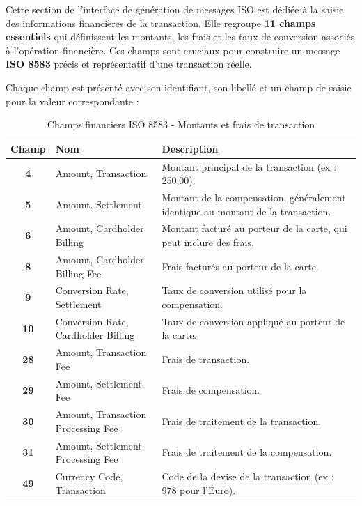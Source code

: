 \begin{enumerate}[label=\alph*)]
Cette section de l'interface de génération de messages ISO est dédiée à la saisie des informations financières de la transaction. Elle regroupe \textbf{11 champs essentiels} qui définissent les montants, les frais et les taux de conversion associés à l'opération financière. Ces champs sont cruciaux pour construire un message \textbf{ISO 8583} précis et représentatif d'une transaction réelle.

Chaque champ est présenté avec son identifiant, son libellé et un champ de saisie pour la valeur correspondante :

\begin{table}[H]
\centering
{}
\renewcommand{\arraystretch}{1.5}
\begin{tabular}{|>{\bfseries}c|m{8cm}|m{6cm}|}
\hline
\rowcolor{blue!20}
\textbf{Champ} & \textbf{Nom} & \textbf{Description} \\
\hline
4 & Amount, Transaction & Montant principal de la transaction (ex : 250,00). \\
\hline
5 & Amount, Settlement & Montant de la compensation, généralement identique au montant de la transaction. \\
\hline
6 & Amount, Cardholder Billing & Montant facturé au porteur de la carte, qui peut inclure des frais. \\
\hline
8 & Amount, Cardholder Billing Fee & Frais facturés au porteur de la carte. \\
\hline
9 & Conversion Rate, Settlement & Taux de conversion utilisé pour la compensation. \\
\hline
10 & Conversion Rate, Cardholder Billing & Taux de conversion appliqué au porteur de la carte. \\
\hline
28 & Amount, Transaction Fee & Frais de transaction. \\
\hline
29 & Amount, Settlement Fee & Frais de compensation. \\
\hline
30 & Amount, Transaction Processing Fee & Frais de traitement de la transaction. \\
\hline
31 & Amount, Settlement Processing Fee & Frais de traitement de la compensation. \\
\hline
49 & Currency Code, Transaction & Code de la devise de la transaction (ex : 978 pour l'Euro). \\
\hline
\end{tabular}
\caption{Champs financiers ISO 8583 - Montants et frais de transaction}
\label{tab:iso-finance-fields}
\end{table}



\end{enumerate}
